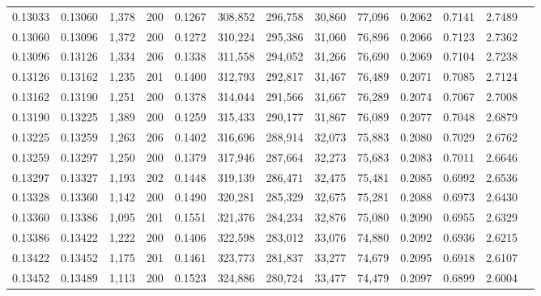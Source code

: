 \begin{tabular}{rrrrrrrrrrrrr}
0.13033 & 0.13060 & 1,378 & 200 &                                     0.1267 & 308,852 & 296,758 &  30,860 &  77,096 & 0.2062 & 0.7141 & 2.7489 \\
0.13060 & 0.13096 & 1,372 & 200 &                                     0.1272 & 310,224 & 295,386 &  31,060 &  76,896 & 0.2066 & 0.7123 & 2.7362 \\
0.13096 & 0.13126 & 1,334 & 206 &                                     0.1338 & 311,558 & 294,052 &  31,266 &  76,690 & 0.2069 & 0.7104 & 2.7238 \\
0.13126 & 0.13162 & 1,235 & 201 &                                     0.1400 & 312,793 & 292,817 &  31,467 &  76,489 & 0.2071 & 0.7085 & 2.7124 \\
0.13162 & 0.13190 & 1,251 & 200 &                                     0.1378 & 314,044 & 291,566 &  31,667 &  76,289 & 0.2074 & 0.7067 & 2.7008 \\
0.13190 & 0.13225 & 1,389 & 200 &                                     0.1259 & 315,433 & 290,177 &  31,867 &  76,089 & 0.2077 & 0.7048 & 2.6879 \\
0.13225 & 0.13259 & 1,263 & 206 &                                     0.1402 & 316,696 & 288,914 &  32,073 &  75,883 & 0.2080 & 0.7029 & 2.6762 \\
0.13259 & 0.13297 & 1,250 & 200 &                                     0.1379 & 317,946 & 287,664 &  32,273 &  75,683 & 0.2083 & 0.7011 & 2.6646 \\
0.13297 & 0.13327 & 1,193 & 202 &                                     0.1448 & 319,139 & 286,471 &  32,475 &  75,481 & 0.2085 & 0.6992 & 2.6536 \\
0.13328 & 0.13360 & 1,142 & 200 &                                     0.1490 & 320,281 & 285,329 &  32,675 &  75,281 & 0.2088 & 0.6973 & 2.6430 \\
0.13360 & 0.13386 & 1,095 & 201 &                                     0.1551 & 321,376 & 284,234 &  32,876 &  75,080 & 0.2090 & 0.6955 & 2.6329 \\
0.13386 & 0.13422 & 1,222 & 200 &                                     0.1406 & 322,598 & 283,012 &  33,076 &  74,880 & 0.2092 & 0.6936 & 2.6215 \\
0.13422 & 0.13452 & 1,175 & 201 &                                     0.1461 & 323,773 & 281,837 &  33,277 &  74,679 & 0.2095 & 0.6918 & 2.6107 \\
0.13452 & 0.13489 & 1,113 & 200 &                                     0.1523 & 324,886 & 280,724 &  33,477 &  74,479 & 0.2097 & 0.6899 & 2.6004 \\

\end{tabular}
